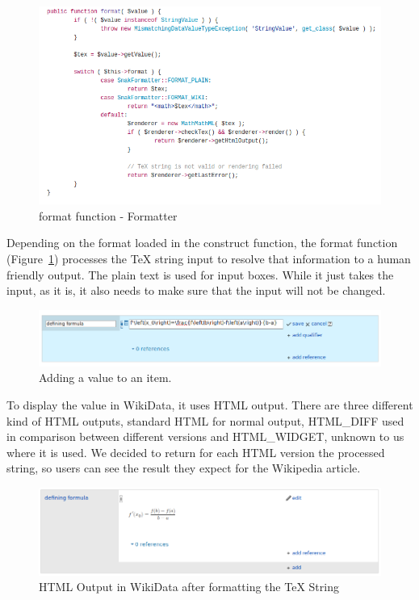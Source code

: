 \documentclass[12pt]{article}
\begin{document}
\begin{figure}[h]
\includegraphics[width = \textwidth]{formatterformat}
\caption{format function - Formatter}
\label{format}
\end{figure}

Depending on the format loaded in the construct function, the format function (Figure~\ref{format}) processes the TeX string input to resolve that information to a human friendly output.
The plain text is used for input boxes. While it just takes the input, as it is, it also needs to make sure that the input will not be changed.
\begin{figure}[h]
\includegraphics[width = \textwidth]{addValue}
\caption{Adding a value to an item.}
\label{addValue}
\end{figure}

To display the value in WikiData, it uses HTML output. There are three different kind of HTML outputs, standard HTML for normal output, HTML\_DIFF used in comparison between different versions and HTML\_WIDGET, unknown to us where it is used. We decided to return for each HTML version the processed string, so users can see the result they expect for the Wikipedia article.
\begin{figure}[h]
\includegraphics[width = \textwidth]{valueOutput}
\caption{HTML Output in WikiData after formatting the TeX String}
\label{valueOutput}
\end{figure}
\end{document}
